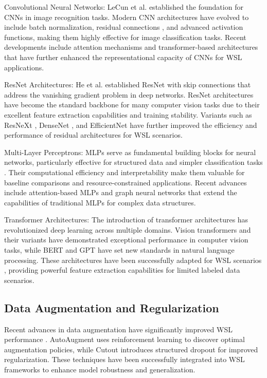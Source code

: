 \documentclass{ieeeaccess}
\begin{document}
Convolutional Neural Networks: LeCun et al. \cite{b9} established the foundation for CNNs in image recognition tasks. Modern CNN architectures have evolved to include batch normalization, residual connections \cite{b10}, and advanced activation functions, making them highly effective for image classification tasks. Recent developments include attention mechanisms \cite{b22} and transformer-based architectures \cite{b24} that have further enhanced the representational capacity of CNNs for WSL applications.

ResNet Architectures: He et al. \cite{b10} established ResNet with skip connections that address the vanishing gradient problem in deep networks. ResNet architectures have become the standard backbone for many computer vision tasks due to their excellent feature extraction capabilities and training stability. Variants such as ResNeXt \cite{b25}, DenseNet \cite{b26}, and EfficientNet \cite{b27} have further improved the efficiency and performance of residual architectures for WSL scenarios.

Multi-Layer Perceptrons: MLPs serve as fundamental building blocks for neural networks, particularly effective for structured data and simpler classification tasks \cite{b28}. Their computational efficiency and interpretability make them valuable for baseline comparisons and resource-constrained applications. Recent advances include attention-based MLPs \cite{b22} and graph neural networks \cite{b23} that extend the capabilities of traditional MLPs for complex data structures.

Transformer Architectures: The introduction of transformer architectures \cite{b22} has revolutionized deep learning across multiple domains. Vision transformers \cite{b24} and their variants have demonstrated exceptional performance in computer vision tasks, while BERT \cite{b22} and GPT \cite{b23} have set new standards in natural language processing. These architectures have been successfully adapted for WSL scenarios \cite{b24}, providing powerful feature extraction capabilities for limited labeled data scenarios.

\subsection{Data Augmentation and Regularization}
Recent advances in data augmentation have significantly improved WSL performance \cite{b25}. AutoAugment \cite{b15} uses reinforcement learning to discover optimal augmentation policies, while Cutout \cite{b16} introduces structured dropout for improved regularization. These techniques have been successfully integrated into WSL frameworks to enhance model robustness and generalization.
\end{document}
